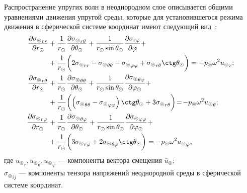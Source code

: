 Распространение упругих волн в неоднородном слое описывается общими уравнениями движения упругой среды, которые для установившегося режима движения в сферической системе координат имеют следующий вид~\cite{Nowacki}:
\begin{equation}\label{eq_moving}
\begin{split}
\frac{\partial{\sigma_\circledcirc}_{rr}}{\partial r_\odot} &+ \frac1{r_\odot} \frac{\partial{\sigma_\circledcirc}_{r\theta}}{\partial\theta_\odot} + \frac{1}{r_\odot\sin\theta_\odot}\frac{\partial\sigma_{r\varphi}}{\partial\varphi} +\\
&+ \frac1{r_\odot}\biggl(2{\sigma_\circledcirc}_{rr}-{\sigma_\circledcirc}_{\theta\theta}-{\sigma_\circledcirc}_{\varphi\varphi}+{\sigma_\circledcirc}_{r\theta}\ctg\theta_\odot\biggr)=-p_\circledcirc\omega^2{u_\circledcirc}_r;\\
\frac{\partial{\sigma_\circledcirc}_{r\theta}}{\partial r_\odot} &+ \frac1{r_\odot} \frac{\partial{\sigma_\circledcirc}_{\theta\theta}}{\partial\theta_\odot} + \frac{1}{r_\odot\sin\theta_\odot}\frac{\partial{\sigma_\circledcirc}_{\theta\varphi}}{\partial\varphi_\odot} +\\
&+ \frac1{r_\odot}\biggl(\left({\sigma_\circledcirc}_{\theta\theta}-{\sigma_\circledcirc}_{\varphi\varphi}\right)\ctg\theta_\odot+3{\sigma_\circledcirc}_{r\theta}\biggr)\!=\!-p_\circledcirc\omega^2{u_\circledcirc}_\theta;\\
\frac{\partial{\sigma_\circledcirc}_{r\varphi}}{\partial r_\odot} &+ \frac1{r_\odot} \frac{\partial{\sigma_\circledcirc}_{\theta\varphi}}{\partial\theta_\odot} + \frac{1}{r_\odot\sin\theta_\odot}\frac{\partial{\sigma_\circledcirc}_{\varphi\varphi}}{\partial\varphi_\odot} +\\
&+ \frac1{r_\odot}\biggl(3{\sigma_\circledcirc}_{r\varphi}+2{\sigma_\circledcirc}_{\theta\varphi}\ctg\theta_\odot\biggr)=-p_\circledcirc\omega^2{u_\circledcirc}_\varphi,
\end{split}
\end{equation}
где ${u_\circledcirc}_r, {u_\circledcirc}_\theta, {u_\circledcirc}_\varphi$ --- компоненты вектора смещения $\bar{u}_\circledcirc$;\\
${\sigma_\circledcirc}_{ij}$ --- компоненты тензора напряжений неоднородной среды в сферической системе координат.

